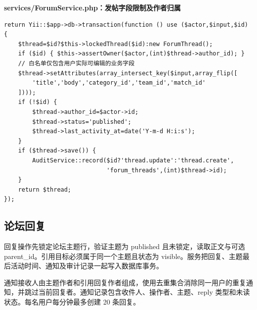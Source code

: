 \documentclass[UTF8,a4paper,11pt]{ctexart}
\begin{document}
\noindent\textbf{services/ForumService.php：发帖字段限制及作者归属}\par\vspace{2pt}
\begin{lstlisting}
return Yii::$app->db->transaction(function () use ($actor,$input,$id) {
    $thread=$id?$this->lockedThread($id):new ForumThread();
    if ($id) { $this->assertOwner($actor,(int)$thread->author_id); }
    // 白名单仅包含用户实际可编辑的业务字段
    $thread->setAttributes(array_intersect_key($input,array_flip([
        'title','body','category_id','team_id','match_id'
    ])));
    if (!$id) {
        $thread->author_id=$actor->id;
        $thread->status='published';
        $thread->last_activity_at=date('Y-m-d H:i:s');
    }
    if ($thread->save()) {
        AuditService::record($id?'thread.update':'thread.create',
                             'forum_threads',(int)$thread->id);
    }
    return $thread;
});
\end{lstlisting}

\subsection{论坛回复}
回复操作先锁定论坛主题行，验证主题为 published 且未锁定，读取正文与可选 parent\_id。引用目标必须属于同一个主题且状态为 visible。服务把回复、主题最后活动时间、通知及审计记录一起写入数据库事务。

通知接收人由主题作者和引用回复作者组成，使用去重集合消除同一用户的重复通知，并跳过当前回复者。通知记录包含收件人、操作者、主题、reply 类型和未读状态。每名用户每分钟最多创建 20 条回复。
\end{document}
